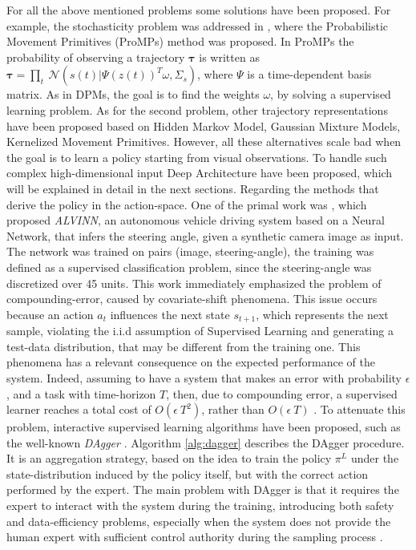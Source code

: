 For all the above mentioned problems some solutions have been proposed. For example, the stochasticity problem was addressed in \cite{paraschos2013ProMPs}, where the Probabilistic Movement Primitives (ProMPs) method was proposed. In ProMPs the probability of observing a trajectory $\boldsymbol{\tau}$ is written as $\boldsymbol{\tau} = \underset{t}{\prod} \ \mathcal{N}(s(t)|\Psi(z(t))^{T}\omega, \Sigma_{s})$, where $\Psi$ is a time-dependent basis matrix. As in DPMs, the goal is to find the weights $\omega$, by solving a supervised learning problem. As for the second problem, other trajectory representations have been proposed based on Hidden Markov Model, Gaussian Mixture Models, Kernelized Movement Primitives. However, all these alternatives scale bad when the goal is to learn a policy starting from visual observations. To handle such complex high-dimensional input Deep Architecture have been proposed, which will be explained in detail in the next sections. 
\newline Regarding the methods that derive the policy in the action-space. One of the primal work was \cite{pomerleau1988alvinn}, which proposed \textit{ALVINN}, an autonomous vehicle driving system based on a Neural Network, that infers the steering angle, given a synthetic camera image as input. The network was trained on pairs (image, steering-angle), the training was defined as a supervised classification problem, since the steering-angle was discretized over 45 units. This work immediately emphasized the problem of compounding-error, caused by covariate-shift phenomena. This issue occurs because an action $a_{t}$ influences the next state $s_{t+1}$, which represents the next sample, violating the i.i.d assumption of Supervised Learning and generating a test-data distribution, that may be different from the training one. This phenomena has a relevant consequence on the expected performance of the system. Indeed, assuming to have a system that makes an error with probability $\epsilon$, and a task with time-horizon $T$, then, due to compounding error, a supervised learner reaches a total cost of $O(\epsilon \ T^{2})$, rather than $O(\epsilon \ T)$ \cite{ross2010efficient_reductions,ross2011dagger}. To attenuate this problem, interactive supervised learning algorithms have been proposed, such as the well-known \textit{DAgger} \cite{ross2011dagger}. Algorithm \ref{alg:dagger} describes the DAgger procedure. It is an aggregation strategy, based on the idea to train the policy $\pi^{L}$ under the state-distribution induced by the policy itself, but with the correct action performed by the expert. The main problem with DAgger is that it requires the expert to interact with the system during the training, introducing both safety and data-efficiency problems, especially when the system does not provide the human expert with sufficient control authority during the sampling process \cite{laskey2017comparing_hc_rc}. 
